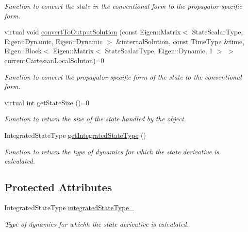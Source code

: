 \begin{DoxyCompactItemize}
\begin{DoxyCompactList}\small\item\em Function to convert the state in the conventional form to the propagator-\/specific form. \end{DoxyCompactList}\item 
virtual void \hyperlink{classtudat_1_1propagators_1_1SingleStateTypeDerivative_aeab2b2a9eae937200a5def64dcf18960}{convert\+To\+Output\+Solution} (const Eigen\+::\+Matrix$<$ State\+Scalar\+Type, Eigen\+::\+Dynamic, Eigen\+::\+Dynamic $>$ \&internal\+Solution, const Time\+Type \&time, Eigen\+::\+Block$<$ Eigen\+::\+Matrix$<$ State\+Scalar\+Type, Eigen\+::\+Dynamic, 1 $>$ $>$ current\+Cartesian\+Local\+Soluton)=0
\begin{DoxyCompactList}\small\item\em Function to convert the propagator-\/specific form of the state to the conventional form. \end{DoxyCompactList}\item 
virtual int \hyperlink{classtudat_1_1propagators_1_1SingleStateTypeDerivative_a53afad2061854a2cc8c03bfce3b3cf2a}{get\+State\+Size} ()=0
\begin{DoxyCompactList}\small\item\em Function to return the size of the state handled by the object. \end{DoxyCompactList}\item 
Integrated\+State\+Type \hyperlink{classtudat_1_1propagators_1_1SingleStateTypeDerivative_a2dbb19e97c9fde342788832fece0a5ff}{get\+Integrated\+State\+Type} ()
\begin{DoxyCompactList}\small\item\em Function to return the type of dynamics for which the state derivative is calculated. \end{DoxyCompactList}\end{DoxyCompactItemize}
\subsection*{Protected Attributes}
\begin{DoxyCompactItemize}
\item 
Integrated\+State\+Type \hyperlink{classtudat_1_1propagators_1_1SingleStateTypeDerivative_a741436a816b5d018f80f061d15fdac74}{integrated\+State\+Type\+\_\+}\hypertarget{classtudat_1_1propagators_1_1SingleStateTypeDerivative_a741436a816b5d018f80f061d15fdac74}{}\label{classtudat_1_1propagators_1_1SingleStateTypeDerivative_a741436a816b5d018f80f061d15fdac74}

\begin{DoxyCompactList}\small\item\em Type of dynamics for whichh the state derivative is calculated. \end{DoxyCompactList}\end{DoxyCompactItemize}


